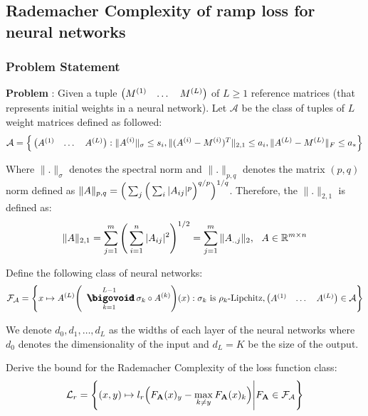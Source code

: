 \newpage
\subsection{Rademacher Complexity of ramp loss for neural networks}
\subsubsection{Problem Statement}
\label{sec:rad_complexity_of_ramp_loss_nn}
\textbf{Problem} : Given a tuple $\begin{pmatrix}M^{(1)} & \dots & M^{(L)}\end{pmatrix}$ of $L\ge 1$ reference matrices (that represents initial weights in a neural network). Let $\mathcal{A}$ be the class of tuples of $L$ weight matrices defined as followed:
\begin{align*}
    \mathcal{A} = \Big\{ 
        \begin{pmatrix}
            A^{(1)} & \dots & A^{(L)}
        \end{pmatrix} : \|A^{(i)}\|_\sigma \le s_i, \|(A^{(i)} - M^{(i)})^T\|_{2, 1}\le a_i, \|A^{(L)} - M^{(L)}\|_F \le a_*
     \Big\}
\end{align*}

\noindent Where $\|.\|_\sigma$ denotes the spectral norm and $\|.\|_{p, q}$ denotes the matrix $(p, q)$ norm defined as $\|A\|_{p, q} = \Big( \sum_j\Big( \sum_{i}|A_{ij}|^p \Big)^{q/p} \Big)^{1/q}$. Therefore, the $\|.\|_{2, 1}$ is defined as:
\begin{align*}
    \|A\|_{2, 1} = \sum_{j=1}^m \Bigg( 
        \sum_{i=1}^n |A_{ij}|^2
     \Bigg)^{1/2}
    = \sum_{j=1}^m \|A_{., j}\|_2, \ \ A\in\mathbb{R}^{m\times n}
\end{align*}

\noindent Define the following class of neural networks:
\begin{align*}
    \F_\mathcal{A} = \biggCurl{
        x\mapsto \A{L} \biggRound{
            \bigO_{k=1}^{L-1} \sigma_k \circ \A{k}
        }(x) : \sigma_k \text{ is } \rho_k\text{-Lipchitz}, \begin{pmatrix}
            \A{1} & \dots & \A{L}
        \end{pmatrix} \in \mathcal{A}
    }
\end{align*}

\noindent We denote $d_0, d_1, \dots, d_L$ as the widths of each layer of the neural networks where $d_0$ denotes the dimensionality of the input and $d_L=K$ be the size of the output. 


\noindent Derive the bound for the Rademacher Complexity of the loss function class:
\begin{align*}
    \mathcal{L}_r = \Bigg\{ 
        (x, y) \mapsto l_r\Big( 
            F_{\bf A}(x)_y - \max_{k\ne y}F_{\bf A}(x)_k
         \Big) \Bigg| F_{\bf A} \in \mathcal{F}_\mathcal{A}
     \Bigg\}
\end{align*}

